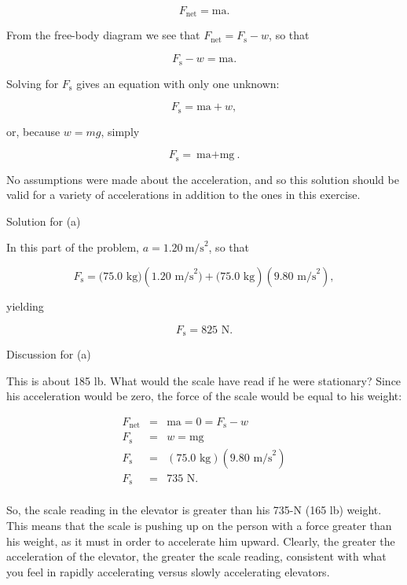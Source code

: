 \documentclass[
]{book}
\begin{document}
\leavevmode{}%
\[{F_{\text{net}} = \text{ma}}.\]

From the free-body diagram we see that
\({F_{\text{net}} = {F_{\text{s}} - w}}{}\), so that

\leavevmode{}%
\[{{F_{\text{s}} - w} = \text{ma}}.\]

Solving for \(F_{\text{s}}{}\) gives an equation with only one unknown:

\leavevmode{}%
\[{F_{\text{s}} = {\text{ma} + w}},\]

or, because \(w = {mg}\), simply

\leavevmode{}%
\[{F_{\text{s}} = {\text{ma} + \text{mg}}}.\]

No assumptions were made about the acceleration, and so this solution
should be valid for a variety of accelerations in addition to the ones
in this exercise.

{Solution for (a)}

In this part of the problem, \({a = 1.20\ \text{m/s}^{2}}{}\), so that

\leavevmode{}%
\[{{F_{\text{s}} = (}\text{75}\text{.}\text{0\ kg})(1\text{.}\text{20\ m/s}^{2}{) + (}\text{75}\text{.}\text{0\ kg})(9\text{.}\text{80\ m/s}^{2})},\]

yielding

\leavevmode{}%
\[{{F_{\text{s}} = 8}\text{25\ N}}.\]

{Discussion for (a)}

This is about 185 lb. What would the scale have read if he were
stationary? Since his acceleration would be zero, the force of the scale
would be equal to his weight:

\leavevmode{}%
\[\begin{array}{lll}
F_{\text{net}} & = & {\text{ma} = 0 = {F_{\text{s}} - w}} \\
F_{\text{s}} & = & {w = \text{mg}} \\
F_{\text{s}} & = & {(\text{75.0\ kg})(9.\text{80\ m/s}^{2})} \\
F_{\text{s}} & = & \text{735\ N.} \\
\end{array}\]

So, the scale reading in the elevator is greater than his 735-N (165 lb)
weight. This means that the scale is pushing up on the person with a
force greater than his weight, as it must in order to accelerate him
upward. Clearly, the greater the acceleration of the elevator, the
greater the scale reading, consistent with what you feel in rapidly
accelerating versus slowly accelerating elevators.
\end{document}
